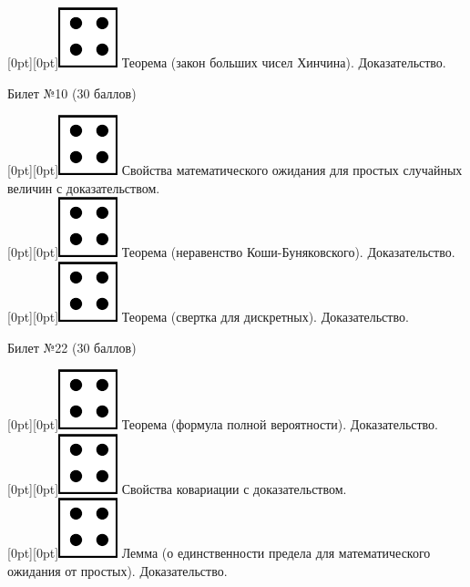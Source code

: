 \documentclass[10pt]{article}
\begin{document}
\raisebox{-1pt}[0pt][0pt]{\includegraphics[width=0.02\linewidth]{4.png}}  Теорема (закон больших чисел Хинчина).  Доказательство. \\

\begin{center} {\Large Билет №10 (30 баллов)} \end{center}

\raisebox{-1pt}[0pt][0pt]{\includegraphics[width=0.02\linewidth]{4.png}} Свойства математического ожидания для  простых случайных величин с доказательством. \\

\raisebox{-1pt}[0pt][0pt]{\includegraphics[width=0.02\linewidth]{4.png}} Теорема (неравенство Коши-Буняковского). Доказательство. \\

\raisebox{-1pt}[0pt][0pt]{\includegraphics[width=0.02\linewidth]{4.png}} Теорема (свертка для дискретных). Доказательство. \\

\begin{center} {\Large Билет №22 (30 баллов)} \end{center}

\raisebox{-1pt}[0pt][0pt]{\includegraphics[width=0.02\linewidth]{4.png}} Теорема (формула полной вероятности). Доказательство. \\

\raisebox{-1pt}[0pt][0pt]{\includegraphics[width=0.02\linewidth]{4.png}} Свойства ковариации с доказательством. \\

\raisebox{-1pt}[0pt][0pt]{\includegraphics[width=0.02\linewidth]{4.png}} Лемма (о единственности предела для математического ожидания от простых). Доказательство. \\ 
\end{document}
